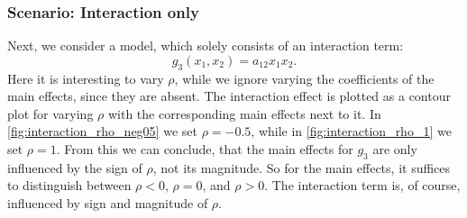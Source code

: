 \subsubsection*{Scenario: Interaction only}
Next, we consider a model, which solely consists of an interaction term: $$g_3(x_1, x_2) = a_{12} x_1 x_2.$$
Here it is interesting to vary $\rho$, while we ignore varying the coefficients of the main effects, since they are absent. The interaction effect is plotted as a contour plot for varying $\rho$ with the corresponding main effects next to it.
In \autoref{fig:interaction_rho_neg05} we set $\rho = -0.5$, while in \autoref{fig:interaction_rho_1} we set $\rho = 1$. From this we can conclude, that the main effects for $g_3$ are only influenced by the sign of $\rho$, not its magnitude. So for the main effects, it suffices to distinguish between $\rho < 0$, $\rho = 0$, and $\rho > 0$. The interaction term is, of course, influenced by sign and magnitude of $\rho$.
